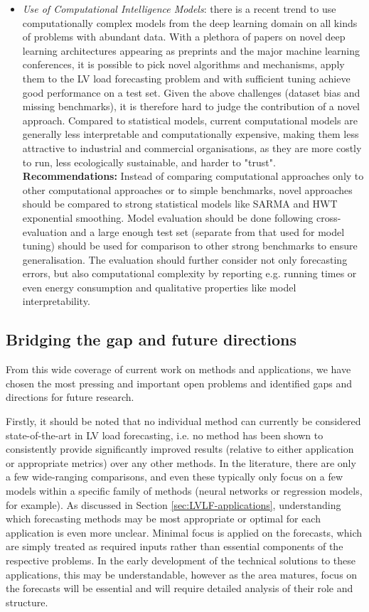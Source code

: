 \begin{itemize}
	\item \textit{Use of Computational Intelligence Models}: there is a recent trend to use computationally complex models from the deep learning domain on all kinds of problems with abundant data. With a plethora of papers on novel deep learning architectures appearing as preprints and the major machine learning conferences, it is possible to pick novel algorithms and mechanisms, apply them to the LV load forecasting problem and with sufficient tuning achieve good performance on a test set. Given the above challenges (dataset bias and missing benchmarks), it is therefore hard to judge the contribution of a novel approach. Compared to statistical models, current computational models are generally less interpretable and computationally expensive, making them less attractive to industrial and commercial organisations, as they are more costly to run, less ecologically sustainable, and harder to "trust". \textbf{Recommendations:} Instead of comparing computational approaches only to other computational approaches or to simple benchmarks, novel approaches should be compared to strong statistical models like SARMA and HWT exponential smoothing. Model evaluation should be done following cross-evaluation and a large enough test set (separate from that used for model tuning) should be used for comparison to other strong benchmarks to ensure generalisation. The evaluation should further consider not only forecasting errors, but also computational complexity by reporting e.g. running times or even energy consumption and qualitative properties like model interpretability.
	
	
\end{itemize}

\subsection{Bridging the gap and future directions}
From this wide coverage of current work on methods and applications, we have chosen the most pressing and important open problems and identified gaps and directions for future research.

Firstly, it should be noted that no individual method can currently be considered state-of-the-art in LV load forecasting, i.e. no method has been shown to consistently provide significantly improved results (relative to either application or appropriate metrics) over any other methods. In the literature, there are only a few wide-ranging comparisons, and even these typically only focus on a few models within a specific family of methods (neural networks or regression models, for example). As discussed in Section \ref{sec:LVLF-applications}, understanding which forecasting methods may be most appropriate or optimal for each application is even more unclear. Minimal focus is applied on the forecasts, which are simply treated as required inputs rather than  essential components of the respective problems. In the early development of the technical solutions to these applications, this may be understandable, however as the area matures, focus on the forecasts will be essential and will require detailed analysis of their role and structure. 

